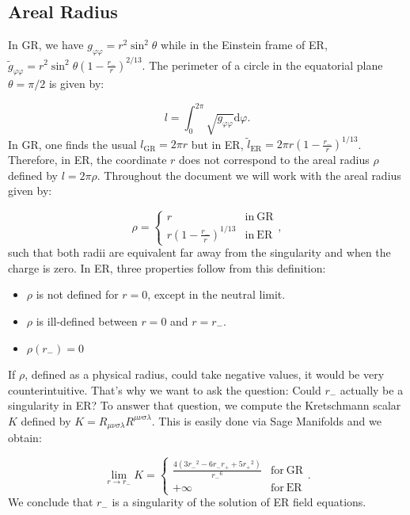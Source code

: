 \documentclass[floats,floatfix,aps, preprintnumbers,nofootinbib]{revtex4-2}
\newcommand{\paren}[1]{\left( #1 \right)}
\newcommand{\mrm}{\mathrm}
\begin{document}
\subsection{Areal Radius}

In GR, we have $g_{\varphi\varphi} = r^2\sin^2\theta$ while in the Einstein frame of ER, $\tilde g_{\varphi\varphi} = r^2\sin^2\theta\paren{1 - \frac{r_-}{r}}^{2/13}$. The perimeter of a circle in the equatorial plane $\theta=\pi/2$ is given by:

\begin{equation}
    l = \int_0^{2\pi}\sqrt{g_{\varphi\varphi}}\mrm d\varphi.
\end{equation}
In GR, one finds the usual $l_\mrm{GR} = 2\pi r$ but in ER, $\tilde l_\mrm{ER} = 2\pi r \paren{1 - \frac{r_-}{r}}^{1/13}$. Therefore, in ER, the coordinate $r$ does not correspond to the areal radius $\rho$ defined by $l = 2\pi\rho$. Throughout the document we will work with the areal radius given by:

\begin{equation}
    \rho = \left\{\begin{matrix}
        r &\mrm{in \ GR} \\
        r\paren{1 - \frac{r_-}{r}}^{1/13} &\mrm{in \ ER}
    \end{matrix} \right.,
\end{equation}
such that both radii are equivalent far away from the singularity and when the charge is zero. In ER, three properties follow from this definition:
\begin{itemize}
    \item $\rho$ is not defined for $r=0$, except in the neutral limit.
    \item $\rho$ is ill-defined between $r=0$ and $r=r_-$.
    \item $\rho(r_-) = 0$
\end{itemize}
If $\rho$, defined as a physical radius, could take negative values, it would be very counterintuitive. That's why we want to ask the question: Could $r_-$ actually be a singularity in ER? To answer that question, we compute the Kretschmann scalar $K$ defined by $K = R_{\mu\nu\sigma\lambda} R^{\mu\nu\sigma\lambda}$. This is easily done via Sage Manifolds \cite{Gourgoulhon_2015} and we obtain:

\begin{equation}
    \lim_{r\to r_-}K = \left\{\begin{matrix}
        \frac{4  {\left(3 {r_-}^{2} - 6 {r_-} {r_+} + 5  {r_+}^{2}\right)}}{{r_-}^{6}} &\mrm{for \ GR}\\
        +\infty &\mrm{for \ ER}
    \end{matrix} \right. .
\end{equation}
We conclude that $r_-$ is a singularity of the solution of ER field equations. 
\end{document}
